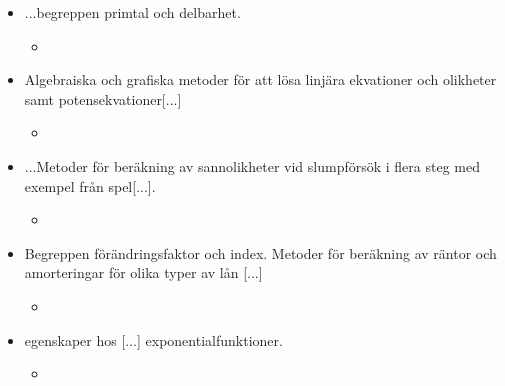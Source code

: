 \begin{itemize}
\item \lbrack...\rbrack begreppen primtal och delbarhet.
	\begin{itemize}
	\item {}
	\end{itemize}
\item Algebraiska och grafiska metoder för att lösa linjära ekvationer och olikheter samt potensekvationer[...]
	\begin{itemize}
	\item {}
	\end{itemize}
\item \lbrack...M\rbrack etoder för beräkning av sannolikheter vid slumpförsök i flera steg med exempel från spel[...].
	\begin{itemize}
	\item {}
	\end{itemize}
\item Begreppen förändringsfaktor och index. Metoder för beräkning av räntor och amorteringar för olika typer av lån [...]
	\begin{itemize}
	\item {}
	\end{itemize}
\item egenskaper hos [...] exponentialfunktioner.
	\begin{itemize}
	\item {}
	\end{itemize}
\end{itemize}

